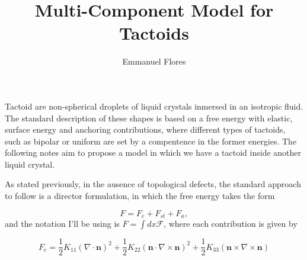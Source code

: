 \documentclass[11pt]{article}
\title{Multi-Component Model for Tactoids}
\author{Emmanuel Flores}
\begin{document}
\maketitle
Tactoid are non-spherical droplets of liquid crystals inmersed in an isotropic fluid. The standard description of these shapes is based on a free energy with elastic, surface energy and anchoring contributions, where different types of tactoids, such as bipolar or uniform are set by a compentence in the former energies. 
The following notes aim to propose a model in which we have a tactoid inside another liquid crystal.

As stated previously, in the ausence of topological defects, the standard approach to follow is a director formulation, in which the free energy takes the form

\begin{equation}
F = F_{e} + F_{st} + F_{a},
\end{equation}
and the notation I'll be using is $F = \int dx\mathcal{F}$, where each contribution is given by

\begin{equation}
F_{e} = \frac{1}{2}K_{11}(\nabla\cdot\mathbf{n})^2 + \frac{1}{2}K_{22}\left( \mathbf{n}\cdot \nabla\times \mathbf{n}\right)^2 + \frac{1}{2}K_{33}\left( \mathbf{n}\times\nabla\times\mathbf{n}\right)
\end{equation}
\end{document}
